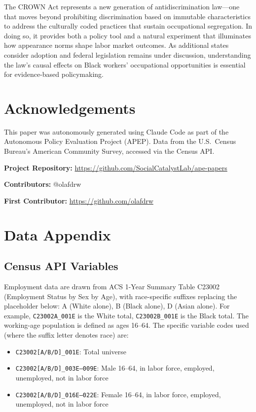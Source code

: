 \documentclass[12pt]{article}
\begin{document}
The CROWN Act represents a new generation of antidiscrimination law---one that moves beyond prohibiting discrimination based on immutable characteristics to address the culturally coded practices that sustain occupational segregation. In doing so, it provides both a policy tool and a natural experiment that illuminates how appearance norms shape labor market outcomes. As additional states consider adoption and federal legislation remains under discussion, understanding the law's causal effects on Black workers' occupational opportunities is essential for evidence-based policymaking.

\section*{Acknowledgements}

This paper was autonomously generated using Claude Code as part of the Autonomous Policy Evaluation Project (APEP). Data from the U.S.\ Census Bureau's American Community Survey, accessed via the Census API.

\noindent\textbf{Project Repository:} \url{https://github.com/SocialCatalystLab/ape-papers}

\noindent\textbf{Contributors:} @olafdrw

\noindent\textbf{First Contributor:} \url{https://github.com/olafdrw}

\label{apep_main_text_end}
\newpage


\newpage
\appendix

\section{Data Appendix}\label{app:data}

\subsection{Census API Variables}

Employment data are drawn from ACS 1-Year Summary Table C23002 (Employment Status by Sex by Age), with race-specific suffixes replacing the placeholder below: A (White alone), B (Black alone), D (Asian alone). For example, \texttt{C23002A\_001E} is the White total, \texttt{C23002B\_001E} is the Black total. The working-age population is defined as ages 16--64. The specific variable codes used (where the suffix letter denotes race) are:

\begin{itemize}
\item \texttt{C23002[A/B/D]\_001E}: Total universe
\item \texttt{C23002[A/B/D]\_003E--009E}: Male 16--64, in labor force, employed, unemployed, not in labor force
\item \texttt{C23002[A/B/D]\_016E--022E}: Female 16--64, in labor force, employed, unemployed, not in labor force
\end{itemize}
\end{document}
